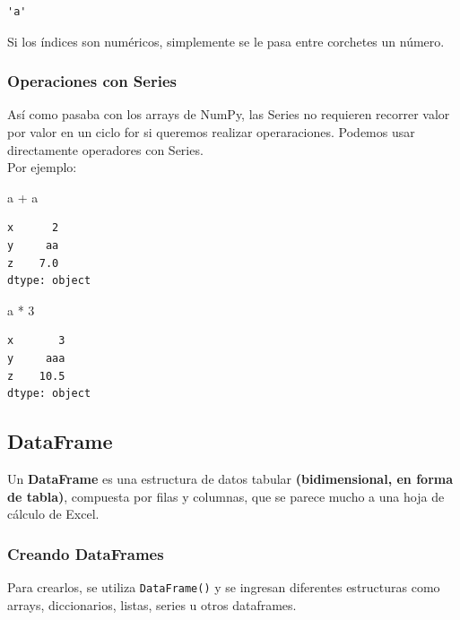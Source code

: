 \documentclass[
  letterpaper,
  DIV=11,
  numbers=noendperiod]{scrreprt}
\newenvironment{Shaded}{\begin{snugshade}}{\end{snugshade}}
\newcommand{\DecValTok}[1]{\textcolor[rgb]{0.68,0.00,0.00}{#1}}
\newcommand{\NormalTok}[1]{\textcolor[rgb]{0.00,0.23,0.31}{#1}}
\newcommand{\OperatorTok}[1]{\textcolor[rgb]{0.37,0.37,0.37}{#1}}
\begin{document}
\begin{verbatim}
'a'
\end{verbatim}

Si los índices son numéricos, simplemente se le pasa entre corchetes un
número.

\subsubsection{Operaciones con Series}\label{operaciones-con-series}

Así como pasaba con los arrays de NumPy, las Series no requieren
recorrer valor por valor en un ciclo for si queremos realizar
operaraciones. Podemos usar directamente operadores con Series.\\
Por ejemplo:

\begin{Shaded}
\begin{Highlighting}[]
\NormalTok{a }\OperatorTok{+}\NormalTok{ a}
\end{Highlighting}
\end{Shaded}

\begin{verbatim}
x      2
y     aa
z    7.0
dtype: object
\end{verbatim}

\begin{Shaded}
\begin{Highlighting}[]
\NormalTok{a }\OperatorTok{*} \DecValTok{3}
\end{Highlighting}
\end{Shaded}

\begin{verbatim}
x       3
y     aaa
z    10.5
dtype: object
\end{verbatim}

\subsection{DataFrame}\label{dataframe}

Un \textbf{DataFrame} es una estructura de datos tabular
\textbf{(bidimensional, en forma de tabla)}, compuesta por filas y
columnas, que se parece mucho a una hoja de cálculo de Excel.

\subsubsection{Creando DataFrames}\label{creando-dataframes}

Para crearlos, se utiliza \texttt{DataFrame()} y se ingresan diferentes
estructuras como arrays, diccionarios, listas, series u otros
dataframes.
\end{document}
